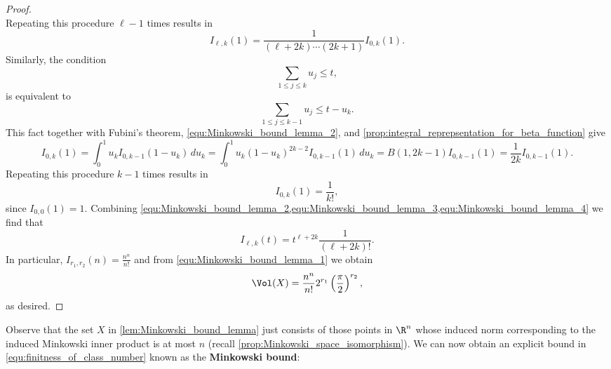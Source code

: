 \begin{proof}
\[      \]
      Repeating this procedure $\ell-1$ times results in
      \begin{equation}\label{equ:Minkowski_bound_lemma_3}
        I_{\ell,k}(1) = \frac{1}{(\ell+2k) \cdots (2k+1)}I_{0,k}(1).
      \end{equation}
      Similarly, the condition
      \[
        \sum_{1 \le j \le k}u_{j} \le t,
      \]
      is equivalent to
      \[
        \sum_{1 \le j \le k-1}u_{j} \le t-u_{k}.
      \]
      This fact together with Fubini's theorem, \cref{equ:Minkowski_bound_lemma_2}, and \cref{prop:integral_reprepsentation_for_beta_function} give
      \[
        I_{0,k}(1) = \int_{0}^{1}u_{k}I_{0,k-1}(1-u_{k})\,du_{k} = \int_{0}^{1}u_{k}(1-u_{k})^{2k-2}I_{0,k-1}(1)\,du_{k} = B(1,2k-1)I_{0,k-1}(1) = \frac{1}{2k}I_{0,k-1}(1).
      \]
      Repeating this procedure $k-1$ times results in
      \begin{equation}\label{equ:Minkowski_bound_lemma_4}
        I_{0,k}(1) = \frac{1}{k!},
      \end{equation}
      since $I_{0,0}(1) = 1$. Combining \cref{equ:Minkowski_bound_lemma_2,equ:Minkowski_bound_lemma_3,equ:Minkowski_bound_lemma_4} we find that
      \[
        I_{\ell,k}(t) = t^{\ell+2k}\frac{1}{(\ell+2k)!}.
      \]
      In particular, $I_{r_{1},r_{2}}(n) = \frac{n^{n}}{n!}$ and from \cref{equ:Minkowski_bound_lemma_1} we obtain
      \[
        \Vol(X) = \frac{n^{n}}{n!}2^{r_{1}}\left(\frac{\pi}{2}\right)^{r_{2}},
      \]
      as desired.
    \end{proof}

    Observe that the set $X$ in \cref{lem:Minkowski_bound_lemma} just consists of those points in $\R^{n}$ whose induced norm corresponding to the induced Minkowski inner product is at most $n$ (recall \cref{prop:Minkowski_space_isomorphism}). We can now obtain an explicit bound in \cref{equ:finitness_of_class_number} known as the \textbf{Minkowski bound}:

